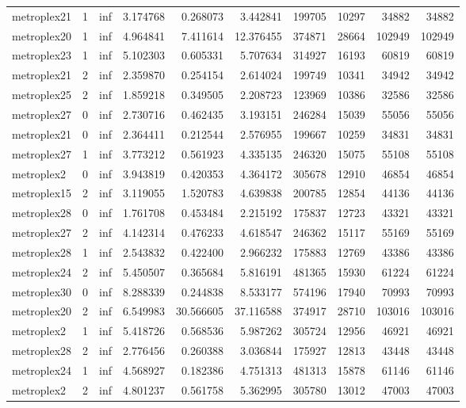 \begin{longtable}{|l|r|r|r|r|r|r|r|r|r|}
metroplex21 & 1 & inf & 3.174768 & 0.268073 & 3.442841 & 199705 & 10297 & 34882 & 34882 \\
metroplex20 & 1 & inf & 4.964841 & 7.411614 & 12.376455 & 374871 & 28664 & 102949 & 102949 \\
metroplex23 & 1 & inf & 5.102303 & 0.605331 & 5.707634 & 314927 & 16193 & 60819 & 60819 \\
metroplex21 & 2 & inf & 2.359870 & 0.254154 & 2.614024 & 199749 & 10341 & 34942 & 34942 \\
metroplex25 & 2 & inf & 1.859218 & 0.349505 & 2.208723 & 123969 & 10386 & 32586 & 32586 \\
metroplex27 & 0 & inf & 2.730716 & 0.462435 & 3.193151 & 246284 & 15039 & 55056 & 55056 \\
metroplex21 & 0 & inf & 2.364411 & 0.212544 & 2.576955 & 199667 & 10259 & 34831 & 34831 \\
metroplex27 & 1 & inf & 3.773212 & 0.561923 & 4.335135 & 246320 & 15075 & 55108 & 55108 \\
metroplex2 & 0 & inf & 3.943819 & 0.420353 & 4.364172 & 305678 & 12910 & 46854 & 46854 \\
metroplex15 & 2 & inf & 3.119055 & 1.520783 & 4.639838 & 200785 & 12854 & 44136 & 44136 \\
metroplex28 & 0 & inf & 1.761708 & 0.453484 & 2.215192 & 175837 & 12723 & 43321 & 43321 \\
metroplex27 & 2 & inf & 4.142314 & 0.476233 & 4.618547 & 246362 & 15117 & 55169 & 55169 \\
metroplex28 & 1 & inf & 2.543832 & 0.422400 & 2.966232 & 175883 & 12769 & 43386 & 43386 \\
metroplex24 & 2 & inf & 5.450507 & 0.365684 & 5.816191 & 481365 & 15930 & 61224 & 61224 \\
metroplex30 & 0 & inf & 8.288339 & 0.244838 & 8.533177 & 574196 & 17940 & 70993 & 70993 \\
metroplex20 & 2 & inf & 6.549983 & 30.566605 & 37.116588 & 374917 & 28710 & 103016 & 103016 \\
metroplex2 & 1 & inf & 5.418726 & 0.568536 & 5.987262 & 305724 & 12956 & 46921 & 46921 \\
metroplex28 & 2 & inf & 2.776456 & 0.260388 & 3.036844 & 175927 & 12813 & 43448 & 43448 \\
metroplex24 & 1 & inf & 4.568927 & 0.182386 & 4.751313 & 481313 & 15878 & 61146 & 61146 \\
metroplex2 & 2 & inf & 4.801237 & 0.561758 & 5.362995 & 305780 & 13012 & 47003 & 47003 \\

\end{longtable}
